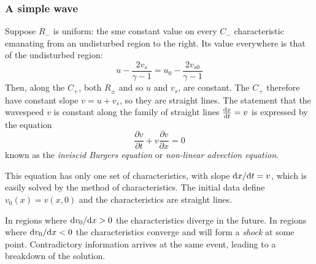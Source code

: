 \documentclass{jknotes}
\begin{document}
\subsubsection{A simple wave}
Suppose $R_-$ is uniform: the sme constant value on every $C_-$ characteristic
emanating from an undisturbed region to the right. Its value everywhere is
that of the undisturbed region:
\begin{equation}
	u - \frac{2 v_s}{\gamma -1} = u_0 - \frac{2v_{s0}}{\gamma -1}
\end{equation}
Then, along the $C_+$, both $R_\pm$ and so $u$ and $v_s$, are constant. The
$C_+$ therefore have constant slope $v = u+v_s$, so they are straight lines.
The statement that the wavespeed $v$ is constant along the family of straight
lines $\frac{\diffd x}{\diffd t} = v$ is expressed by the equation
\begin{equation}
	\frac{\partial v}{\partial t} + v \frac{\partial v}{\partial x} = 0
\end{equation}
known as the \emph{inviscid Burgers equation} or \emph{non-linear advection
equation}. 

This equation has only one set of characteristics, with slope
$\diffd x/\diffd t = v$, which is easily solved by the method of
characteristics. The initial data define $v_0(x) = v(x,0)$ and the
characteristics are straight lines. 

\begin{center}
\end{center}

In regions where $\diffd v_0/\diffd x > 0$
the characteristics diverge in the future. In regions where $\diffd v_0/\diffd
x < 0$ the characteristics converge and will form a \emph{shock} at some
point. Contradictory information arrives at the same event, leading to a
breakdown of the solution.
\end{document}
